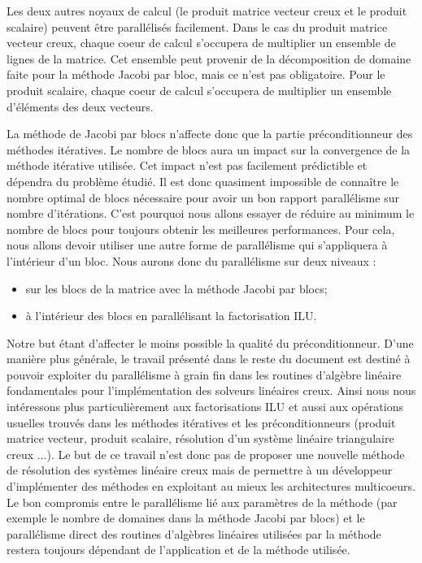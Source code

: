 Les deux autres noyaux de calcul (le produit matrice vecteur creux et le produit scalaire) peuvent être parallélisés facilement.
%
Dans le cas du produit matrice vecteur creux, chaque coeur de calcul s'occupera de multiplier un ensemble de lignes de la matrice.
%
Cet ensemble peut provenir de la décomposition de domaine faite pour la méthode Jacobi par bloc, mais ce n'est pas obligatoire.
%
Pour le produit scalaire, chaque coeur de calcul s'occupera de multiplier un ensemble d'éléments des deux vecteurs.


La méthode de Jacobi par blocs n'affecte donc que la partie préconditionneur des méthodes itératives.
%
Le nombre de blocs aura un impact sur la convergence de la méthode itérative utilisée.
%
Cet impact n'est pas facilement prédictible et dépendra du problème étudié.
%
Il est donc quasiment impossible de connaître le nombre optimal de blocs nécessaire pour avoir un bon rapport parallélisme sur nombre d'itérations.
%
C'est pourquoi nous allons essayer de réduire au minimum le nombre de blocs pour toujours obtenir les meilleures performances.
%
Pour cela, nous allons devoir utiliser une autre forme de parallélisme qui s'appliquera à l'intérieur d'un bloc.
%
Nous aurons donc du parallélisme sur deux niveaux :
\begin{itemize}
  \item sur les blocs de la matrice avec la méthode Jacobi par blocs;
  \item à l'intérieur des blocs en parallélisant la factorisation ILU.
\end{itemize}
%
Notre but étant d'affecter le moins possible la qualité du préconditionneur.
%
D'une manière plus générale, le travail présenté dans le reste du document est destiné à pouvoir exploiter du parallélisme à grain fin dans les routines d'algèbre linéaire fondamentales pour l'implémentation des solveurs linéaires creux.
%
Ainsi nous nous intéressons plus particulièrement aux factorisations ILU et aussi aux opérations usuelles trouvés dans les méthodes itératives et les préconditionneurs (produit matrice vecteur, produit scalaire, résolution d'un système linéaire triangulaire creux ...).
%
Le but de ce travail n'est donc pas de proposer une nouvelle méthode de résolution des systèmes linéaire creux mais de permettre à un développeur d'implémenter des méthodes en exploitant au mieux les architectures multicoeurs.
%
Le bon compromis entre le parallélisme lié aux paramètres de la méthode (par exemple le nombre de domaines dans la méthode Jacobi par blocs) et le parallélisme direct des routines d'algèbres linéaires utilisées par la méthode restera toujours dépendant de l'application et de la méthode utilisée.
